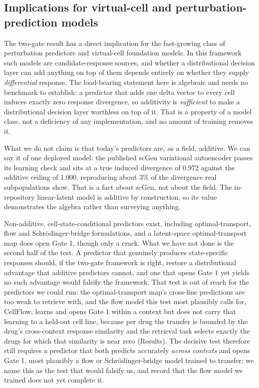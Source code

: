 \documentclass[11pt,letterpaper]{article}
\begin{document}
\subsection*{Implications for virtual-cell and perturbation-prediction models}

The two-gate result has a direct implication for the fast-growing class of perturbation predictors
and virtual-cell foundation models. In this framework such models are
candidate-response sources, and whether a distributional decision layer can add anything
on top of them depends entirely on whether they supply \emph{differential} response. The
load-bearing statement here is algebraic and needs no benchmark to establish: a predictor that
adds one delta vector to every cell induces exactly zero response divergence, so additivity is
\emph{sufficient} to make a distributional decision layer worthless on top of it. That is a
property of a model class, not a deficiency of any implementation, and no amount of training
removes it.

What we do not claim is that today's predictors are, as a field, additive. We can say it of
one deployed model: the published scGen variational autoencoder passes its learning check and sits
at a true induced divergence of 0.972 against the additive ceiling of 1.000, reproducing about 3\%
of the divergence real subpopulations show. That is a fact about scGen, not about the field. The
in-repository linear-latent model is additive by construction, so its value demonstrates the algebra
rather than surveying anything.

Non-additive, cell-state-conditional predictors exist, including optimal-transport, flow and
Schr\"odinger-bridge formulations\cite{CellOT,Departures}, and a latent-space optimal-transport map
does open Gate 1, though only a crack. What we have not done is the second half of the test.
A predictor that genuinely produces state-specific responses should, if the two-gate framework is
right, restore a distributional advantage that additive predictors cannot, and one that opens Gate 1
yet yields no such advantage would falsify the framework. That test is out of reach for the
predictors we could run: the optimal-transport map's cross-line predictions are too weak to retrieve
with, and the flow model this test most plausibly calls for, CellFlow\cite{CellFlow}, learns and
opens Gate 1 within a context but does not carry that learning to a held-out cell line, because per
drug the transfer is bounded by the drug's cross-context response similarity and the retrieval task
selects exactly the drugs for which that similarity is near zero (Results). The decisive test
therefore still requires a predictor that both predicts accurately \emph{across contexts} and opens
Gate 1, most plausibly a flow or Schr\"odinger-bridge model trained to transfer; we name this
as the test that would falsify us, and record that the flow model we trained does not yet complete
it.
\end{document}
